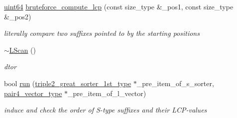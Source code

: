 \begin{DoxyCompactItemize}
\hyperlink{types_8h_a60e8696a4678cd348e991a1f172e53f7}{uint64} \hyperlink{struct_validate4_1_1_l_scan_a9e88ab70a4b681b145bd79fa05d8f13d}{bruteforce\+\_\+compute\+\_\+lcp} (const size\+\_\+type \&\+\_\+pos1, const size\+\_\+type \&\+\_\+pos2)
\begin{DoxyCompactList}\small\item\em literally compare two suffixes pointed to by the starting positions \end{DoxyCompactList}\item 
\hyperlink{struct_validate4_1_1_l_scan_a1ac7b38fcbb0968d0683a0df18fedd9f}{$\sim$\+L\+Scan} ()
\begin{DoxyCompactList}\small\item\em dtor \end{DoxyCompactList}\item 
bool \hyperlink{struct_validate4_1_1_l_scan_ac923c1ac593c291db774594e8f51c9e5}{run} (\hyperlink{class_validate4_aa35a0ebf404821377118043d536be262}{triple2\+\_\+great\+\_\+sorter\+\_\+1st\+\_\+type} $\ast$\+\_\+pre\+\_\+item\+\_\+of\+\_\+s\+\_\+sorter, \hyperlink{class_validate4_a883822e6f1be0d67f71e1feb9729b1dc}{pair4\+\_\+vector\+\_\+type} $\ast$\+\_\+pre\+\_\+item\+\_\+of\+\_\+l\+\_\+vector)
\begin{DoxyCompactList}\small\item\em induce and check the order of S-\/type suffixes and their L\+C\+P-\/values \end{DoxyCompactList}\end{DoxyCompactItemize}
